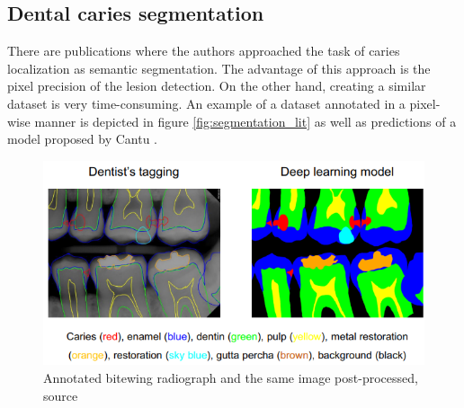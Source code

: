 \subsection{Dental caries segmentation}
There are publications where the authors approached the task of caries localization as semantic segmentation. The advantage of this approach is the pixel precision of the lesion detection. On the other hand, creating a similar dataset is very time-consuming. An example of a dataset annotated in a pixel-wise manner is depicted in figure \ref{fig:segmentation_lit} as well as predictions of a model proposed by Cantu \cite{Cantu2020}.

\begin{figure}
    \centering
    \includegraphics[width=\linewidth]{images/segmentation_bitewing_rich.png}
    \caption{Annotated bitewing radiograph and the same image post-processed, source \cite{Lee2021}}
    \label{fig:bitewing_dense}
\end{figure}

